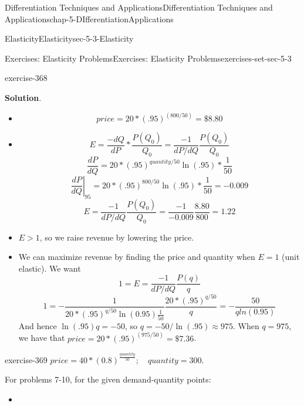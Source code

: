 \documentclass[oneside,10pt,]{book}
\numberwithin{equation}{section}
\newcommand{\gt}{>}
\begin{document}
\begin{chapterptx}{Differentiation Techniques and Applications}{}{Differentiation Techniques and Applications}{}{}{chap-5-DIfferentiationApplications}
\begin{sectionptx}{Elasticity}{}{Elasticity}{}{}{sec-5-3-Elasticity}
\begin{exercises-subsection-numberless}{Exercises: Elasticity Problems}{}{Exercises: Elasticity Problems}{}{}{exercises-set-sec-5-3}
\begin{divisionexercise}{5}{}{}{exercise-368}
\par\smallskip%
\noindent\textbf{Solution}.\hypertarget{solution-185}{}\quad%
\leavevmode%
\begin{itemize}[label=\textbullet]
\item{}%
\begin{equation*}
price=20*(.95)^{(800/50)}=\$8.80
\end{equation*}
%
\item{}%
\begin{equation*}
E=\frac{-d Q}{d P}*\frac{P(Q_0 )}{Q_0}
= \frac{-1}{dP/dQ} \frac{P(Q_0 )}{Q_0} 
\end{equation*}
%
\begin{equation*}
\frac{dP}{dQ}= 20*(.95)^{quantity/50}\ln(.95)*\frac{1}{50}
\end{equation*}
%
\begin{equation*}
\left.\frac{dP}{dQ}\right|_{95}= 20*(.95)^{800/50}\ln(.95)*\frac{1}{50}=-0.009
\end{equation*}
%
\begin{equation*}
E=\frac{-1}{dP/dQ} \frac{P(Q_0 )}{Q_0}
=\frac{-1}{-0.009} \frac{8.80}{800}=1.22 
\end{equation*}
%
\item{}\hypertarget{p-2075}{}%
\(E \gt 1\), so we raise revenue by lowering the price.%
\item{}\hypertarget{p-2076}{}%
We can maximize revenue by finding the price and quantity when \(E = 1\) (unit elastic).  We want%
%
\begin{equation*}
1=E=\frac{-1}{dP/dQ}\frac{P(q)}{q}
\end{equation*}
%
\begin{equation*}
1=-\frac{1}{20*(.95)^{q/50}\ln(0.95)\frac{1}{50}}
\frac{20*(.95)^{q/50}}{q}
=-\frac{50}{q ln(0.95)}
\end{equation*}
\hypertarget{p-2077}{}%
And hence \(\ln(.95)  q= -50\), so \(q= -50/\ln(.95)\approx 975\). When \(q=975\), we have that \(price=20*(.95)^{(975/50) }=\$7.36\).%
\end{itemize}
\end{divisionexercise}%
\begin{divisionexercise}{6}{}{}{exercise-369}%
\(price=40*(0.8)^{\frac{quantity}{50} };\quad quantity=300.\)\end{divisionexercise}%
\hypertarget{p-2078}{}%
For problems 7-10, for the given demand-quantity points:%
\leavevmode%
\begin{itemize}[label=\textbullet]
\item{}\hypertarget{p-2079}{}%

\end{itemize}
\end{exercises-subsection-numberless}
\end{sectionptx}
\end{chapterptx}
\end{document}
